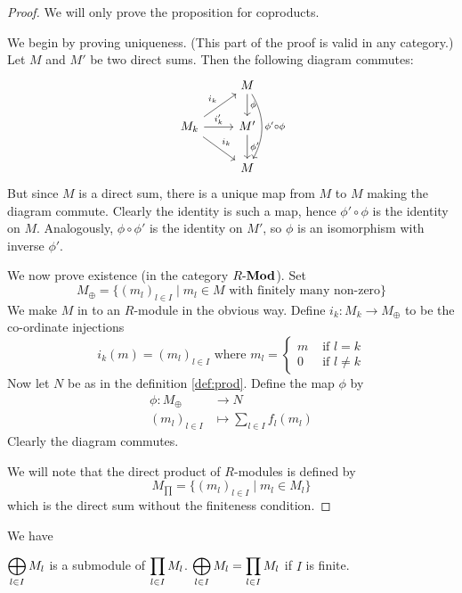 \begin{proof}
	We will only prove the proposition for coproducts.
	
	We begin by proving uniqueness.
	(This part of the proof is valid in any category.)
	Let $M$ and $M'$ be two direct sums.
	Then the following diagram commutes:
	\[
		\begin{tikzcd}
			& M \arrow[d, "\phi"] \arrow[dd, "\phi'\circ\phi", bend left] \\
			M_k \arrow[ru, "i_k"] \arrow[r, "i_k'"] \arrow[rd, "i_k"] & M' \arrow[d, "\phi'"] \\
			& M
		\end{tikzcd}
	\]
	But since $M$ is a direct sum, there is a unique map from $M$ to $M$ making the diagram commute.
	Clearly the identity is such a map, hence $\phi'\circ\phi$ is the identity on $M$.
	Analogously, $\phi\circ\phi'$ is the identity on $M'$, so $\phi$ is an isomorphism with inverse $\phi'$.
	
	We now prove existence (in the category $R\mbox{-}\mathbf{Mod}$).
	Set
	\[M_\oplus = \{(m_l)_{l \in I} \mid m_l \in M \text{ with finitely many non-zero}\}\]
	We make $M$ in to an $R$-module in the obvious way.
	Define $i_k: M_k \to M_\oplus$ to be the co-ordinate injections
	\[i_k(m) = (m_l)_{l \in I} \text{ where } m_l =
		\begin{cases}
			m & \text{ if } l = k \\
			0 & \text{ if } l \neq k
		\end{cases}
	\]
	Now let $N$ be as in the definition \ref{def:prod}.
	Define the map $\phi$ by
	\begin{align*}
		\phi: M_\oplus &\to N \\
		(m_l)_{l \in I} &\mapsto \sum_{l \in I}f_l(m_l)
	\end{align*}
	Clearly the diagram commutes.
	
	We will note that the direct product of $R$-modules is defined by
	\[M_{\prod} = \{(m_l)_{l \in I} \mid m_l \in M_l\}\]
	which is the direct sum without the finiteness condition.
\end{proof}

\begin{rmk}
	We have
	\begin{enum}
		\io $\displaystyle \bigoplus_{l \in I} M_l$ is a submodule of $\displaystyle \prod_{l \in I} M_l$.
		\io $\displaystyle \bigoplus_{l \in I} M_l = \displaystyle \prod_{l \in I} M_l$ if $I$ is finite.
	\end{enum}
\end{rmk}